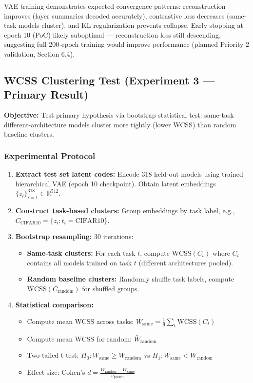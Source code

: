 VAE training demonstrates expected convergence patterns: reconstruction improves (layer summaries decoded accurately), contrastive loss decreases (same-task models cluster), and KL regularization prevents collapse. Early stopping at epoch 10 (PoC) likely suboptimal --- reconstruction loss still descending, suggesting full 200-epoch training would improve performance (planned Priority 2 validation, Section 6.4).

\subsection{WCSS Clustering Test (Experiment 3 --- Primary Result)}

\textbf{Objective:} Test primary hypothesis via bootstrap statistical test: same-task different-architecture models cluster more tightly (lower WCSS) than random baseline clusters.

\subsubsection{Experimental Protocol}

\begin{enumerate}
\item \textbf{Extract test set latent codes:} Encode 318 held-out models using trained hierarchical VAE (epoch 10 checkpoint). Obtain latent embeddings $\{z_i\}_{i=1}^{318} \in \mathbb{R}^{512}$.

\item \textbf{Construct task-based clusters:} Group embeddings by task label, e.g., $C_{\text{CIFAR10}} = \{ z_i : t_i = \text{CIFAR10} \}$.

\item \textbf{Bootstrap resampling:} 30 iterations:
\begin{itemize}
\item \textbf{Same-task clusters:} For each task $t$, compute $\text{WCSS}(C_t)$ where $C_t$ contains all models trained on task $t$ (different architectures pooled).
\item \textbf{Random baseline clusters:} Randomly shuffle task labels, compute $\text{WCSS}(C_{\text{random}})$ for shuffled groups.
\end{itemize}

\item \textbf{Statistical comparison:}
\begin{itemize}
\item Compute mean WCSS across tasks: $\bar{W}_{\text{same}} = \frac{1}{9} \sum_{t} \text{WCSS}(C_t)$
\item Compute mean WCSS for random: $\bar{W}_{\text{random}}$
\item Two-tailed t-test: $H_0: \bar{W}_{\text{same}} \geq \bar{W}_{\text{random}}$ vs $H_1: \bar{W}_{\text{same}} < \bar{W}_{\text{random}}$
\item Effect size: Cohen's $d = \frac{\bar{W}_{\text{random}} - \bar{W}_{\text{same}}}{\sigma_{\text{pooled}}}$
\end{itemize}
\end{enumerate}

